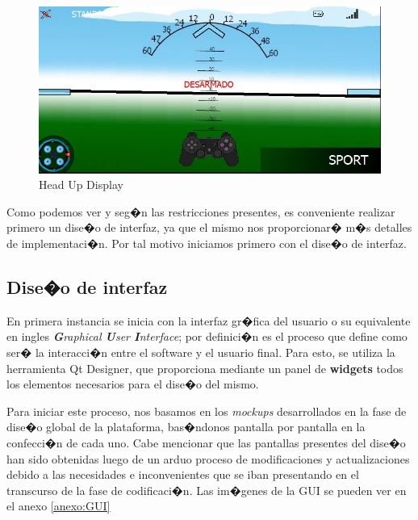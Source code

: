 \begin{figure}[h]
	\centering
	\includegraphics[width=0.5\linewidth, height=0.2\textheight]{Imagenes/hud}
	\caption{Head Up Display}
	\label{fig:hud}
\end{figure}

\par Como podemos ver y seg�n las restricciones presentes, es conveniente realizar primero un dise�o de interfaz, ya que el mismo nos proporcionar� m�s detalles de implementaci�n. Por tal motivo iniciamos primero con el dise�o de interfaz.

\subsection{Dise�o de interfaz}

En primera instancia se inicia con la interfaz gr�fica del usuario o su equivalente en ingles \textit{\textbf{G}raphical \textbf{U}ser \textbf{I}nterface}; por definici�n es el proceso que define como ser� la interacci�n entre el software y el usuario final. Para esto, se utiliza la herramienta Qt Designer, que proporciona mediante un panel de \textbf{widgets} todos los elementos necesarios para el dise�o del mismo. 

\par Para iniciar este proceso, nos basamos en los \textit{mockups}  desarrollados  en la fase de dise�o global de la plataforma, bas�ndonos pantalla por pantalla en la confecci�n de cada uno. Cabe mencionar que las pantallas presentes del dise�o han sido obtenidas luego de un arduo proceso de modificaciones y actualizaciones debido a las necesidades e inconvenientes que se iban presentando en el transcurso de la fase de codificaci�n. Las im�genes de la GUI se pueden ver en el anexo \ref{anexo:GUI}

